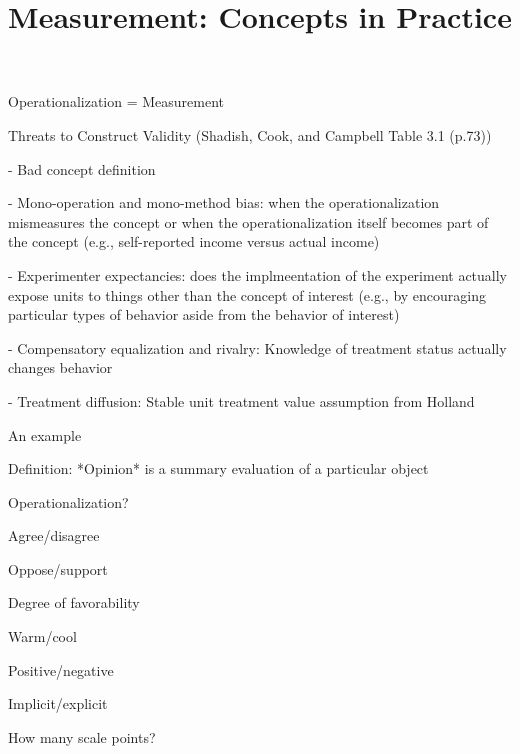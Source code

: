 
\usepackage{tikz}
\usetikzlibrary{shapes,arrows}

\title{Measurement: Concepts in Practice}


\date[]{}



\frame{\titlepage}

\frame{\tableofcontents}


\frame{\tableofcontents[currentsection]}


Operationalization = Measurement




Threats to Construct Validity (Shadish, Cook, and Campbell Table 3.1 (p.73))

  - Bad concept definition
  
  - Mono-operation and mono-method bias: when the operationalization mismeasures the concept or when the operationalization itself becomes part of the concept (e.g., self-reported income versus actual income)
  
  - Experimenter expectancies: does the implmeentation of the experiment actually expose units to things other than the concept of interest (e.g., by encouraging particular types of behavior aside from the behavior of interest)
  
  - Compensatory equalization and rivalry: Knowledge of treatment status actually changes behavior
  
  - Treatment diffusion: Stable unit treatment value assumption from Holland


An example

Definition: *Opinion* is a summary evaluation of a particular object

Operationalization?


Agree/disagree

Oppose/support

Degree of favorability

Warm/cool

Positive/negative

Implicit/explicit

How many scale points?



\appendix
\frame{}


